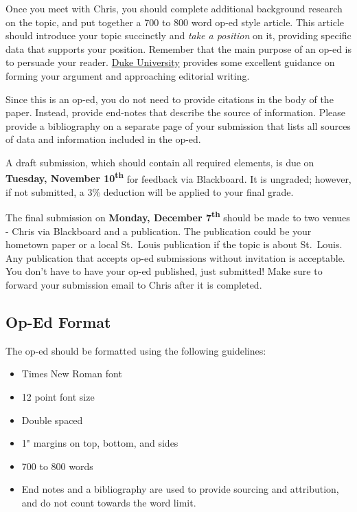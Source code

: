 \documentclass[
]{book}
\providecommand{\tightlist}{%
  \setlength{\itemsep}{0pt}\setlength{\parskip}{0pt}}
\begin{document}
Once you meet with Chris, you should complete additional background research on the topic, and put together a 700 to 800 word op-ed style article. This article should introduce your topic succinctly and \emph{take a position} on it, providing specific data that supports your position. Remember that the main purpose of an op-ed is to persuade your reader. \href{https://styleguide.duke.edu/toolkits/writing-media/how-to-write-an-op-ed-article/}{Duke University} provides some excellent guidance on forming your argument and approaching editorial writing.

Since this is an op-ed, you do not need to provide citations in the body of the paper. Instead, provide end-notes that describe the source of information. Please provide a bibliography on a separate page of your submission that lists all sources of data and information included in the op-ed.

A draft submission, which should contain all required elements, is due on \textbf{Tuesday, November 10\textsuperscript{th}} for feedback via Blackboard. It is ungraded; however, if not submitted, a 3\% deduction will be applied to your final grade.

The final submission on \textbf{Monday, December 7\textsuperscript{th}} should be made to two venues - Chris via Blackboard and a publication. The publication could be your hometown paper or a local St.~Louis publication if the topic is about St.~Louis. Any publication that accepts op-ed submissions without invitation is acceptable. You don't have to have your op-ed published, just submitted! Make sure to forward your submission email to Chris after it is completed.

\hypertarget{op-ed-format}{%
\subsection{Op-Ed Format}\label{op-ed-format}}

The op-ed should be formatted using the following guidelines:

\begin{itemize}
\tightlist
\item
  Times New Roman font
\item
  12 point font size
\item
  Double spaced
\item
  1" margins on top, bottom, and sides
\item
  700 to 800 words
\item
  End notes and a bibliography are used to provide sourcing and attribution, and do not count towards the word limit.
\end{itemize}
\end{document}
